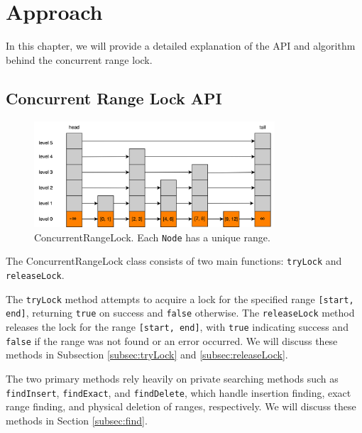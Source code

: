 \chapter{Approach}\label{ch:approach}

In this chapter, we will provide a detailed explanation of the API and algorithm behind the concurrent range lock.

\section{Concurrent Range Lock API}\label{sec:api}

\begin{figure}[h]
    \centering
    \includegraphics[width=0.8\textwidth]{./figures/rangelock.png}
    \caption{ConcurrentRangeLock. Each \texttt{Node} has a unique range.}
    \label{fig:concurrent_range_lock}
\end{figure}

The ConcurrentRangeLock class consists of two main functions: \texttt{tryLock} and \texttt{releaseLock}.

The \texttt{tryLock} method attempts to acquire a lock for the specified range \texttt{[start, end]}, returning \texttt{true} on success and \texttt{false} otherwise.
The \texttt{releaseLock} method releases the lock for the range \texttt{[start, end]}, with \texttt{true} indicating success and \texttt{false} if the range was not found or an error occurred.
We will discuss these methods in Subsection \ref{subsec:tryLock} and \ref{subsec:releaseLock}.

The two primary methods rely heavily on private searching methods such as \texttt{findInsert}, \texttt{findExact}, and \texttt{findDelete}, which handle insertion finding, exact range finding, and physical deletion of ranges, respectively. We will discuss these methods in Section \ref{subsec:find}.

\begin{figure}[h]
    \centering
    
\end{figure}

